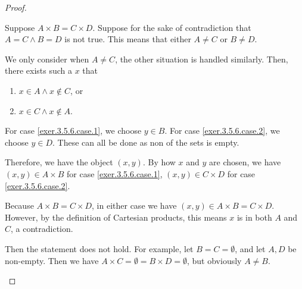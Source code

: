 \begin{proof}
\begin{enumerate}
		\myoifbox
		Suppose $A \times B = C \times D$. Suppose for the sake of contradiction that $A = C \wedge B = D$ is not true. This means that either $A \ne C$ or $B \ne D$.
		
		We only consider when $A \ne C$, the other situation is handled similarly. Then, there exists such a $x$ that
		\begin{enumerate}
			\item $x \in A \wedge x \notin C$, or \label{exer.3.5.6.case.1}
			\item $x \in C \wedge x \notin A$. \label{exer.3.5.6.case.2}
		\end{enumerate}
		For case \eqref{exer.3.5.6.case.1}, we choose $y \in B$. For case \eqref{exer.3.5.6.case.2}, we choose $y \in D$. These can all be done as non of the sets is empty.
	
		Therefore, we have the object $(x,y)$. By how $x$ and $y$ are chosen, we have $(x,y) \in A \times B$ for case \eqref{exer.3.5.6.case.1}, $(x,y) \in C \times D$ for case \eqref{exer.3.5.6.case.2}. 
		
		Because $A \times B = C \times D$, in either case we have $(x,y) \in A \times B = C \times D$. However, by the definition of Cartesian products, this means $x$ is in both $A$ and $C$, a contradiction.
		
		 Then the statement does not hold. For example, let $B = C = \emptyset$, and let $A,D$ be non-empty. Then we have $A \times C = \emptyset = B \times D = \emptyset$, but obviously $A \ne B$.
\end{enumerate}
\end{proof}

